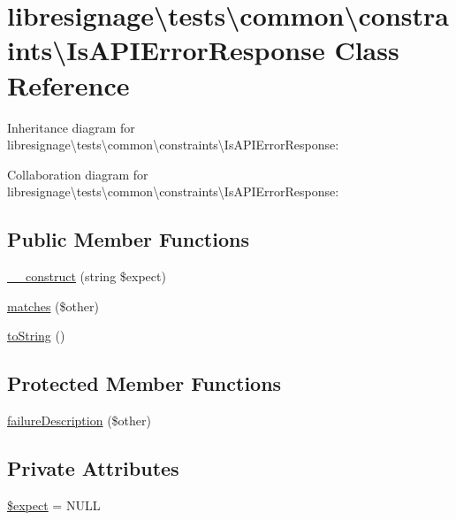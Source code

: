 \hypertarget{classlibresignage_1_1tests_1_1common_1_1constraints_1_1IsAPIErrorResponse}{}\section{libresignage\textbackslash{}tests\textbackslash{}common\textbackslash{}constraints\textbackslash{}Is\+A\+P\+I\+Error\+Response Class Reference}
\label{classlibresignage_1_1tests_1_1common_1_1constraints_1_1IsAPIErrorResponse}


Inheritance diagram for libresignage\textbackslash{}tests\textbackslash{}common\textbackslash{}constraints\textbackslash{}Is\+A\+P\+I\+Error\+Response\+:


Collaboration diagram for libresignage\textbackslash{}tests\textbackslash{}common\textbackslash{}constraints\textbackslash{}Is\+A\+P\+I\+Error\+Response\+:
\subsection*{Public Member Functions}
\begin{DoxyCompactItemize}
\item 
\hyperlink{classlibresignage_1_1tests_1_1common_1_1constraints_1_1IsAPIErrorResponse_a22f2b5b64ef9909d10c07233df9b0511}{\+\_\+\+\_\+construct} (string \$expect)
\item 
\hyperlink{classlibresignage_1_1tests_1_1common_1_1constraints_1_1IsAPIErrorResponse_a105ae671cf5088f0406596050a4801c3}{matches} (\$other)
\item 
\hyperlink{classlibresignage_1_1tests_1_1common_1_1constraints_1_1IsAPIErrorResponse_ab8940398a192af182c4bee00a6675b15}{to\+String} ()
\end{DoxyCompactItemize}
\subsection*{Protected Member Functions}
\begin{DoxyCompactItemize}
\item 
\hyperlink{classlibresignage_1_1tests_1_1common_1_1constraints_1_1IsAPIErrorResponse_a4bbb968b683ff5bee8cd629525ff0560}{failure\+Description} (\$other)
\end{DoxyCompactItemize}
\subsection*{Private Attributes}
\begin{DoxyCompactItemize}
\item 
\hyperlink{classlibresignage_1_1tests_1_1common_1_1constraints_1_1IsAPIErrorResponse_abcd37dabf991b2365cfa260bc0044833}{\$expect} = N\+U\+LL
\end{DoxyCompactItemize}


